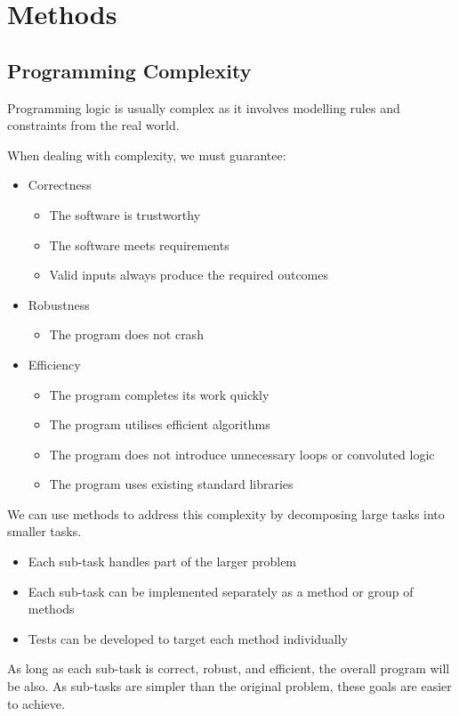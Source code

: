 \documentclass{article}
\begin{document}
\section{Methods}
\subsection{Programming Complexity}
Programming logic is usually complex as it involves modelling rules
and constraints from the real world.

When dealing with complexity, we must guarantee:
\begin{itemize}
    \item Correctness
          \begin{itemize}
              \item The software is trustworthy
              \item The software meets requirements
              \item Valid inputs always produce the required outcomes
          \end{itemize}
    \item Robustness
          \begin{itemize}
              \item The program does not crash
          \end{itemize}
    \item Efficiency
          \begin{itemize}
              \item The program completes its work quickly
              \item The program utilises efficient algorithms
              \item The program does not introduce unnecessary loops or convoluted logic
              \item The program uses existing standard libraries
          \end{itemize}
\end{itemize}
We can use methods to address this complexity by decomposing large tasks into smaller tasks.
\begin{itemize}
    \item Each sub-task handles part of the larger problem
    \item Each sub-task can be implemented separately as a method or group of methods
    \item Tests can be developed to target each method individually
\end{itemize}
As long as each sub-task is correct, robust, and efficient, the overall program will be also.
As sub-tasks are simpler than the original problem, these goals are easier to achieve.
\end{document}
